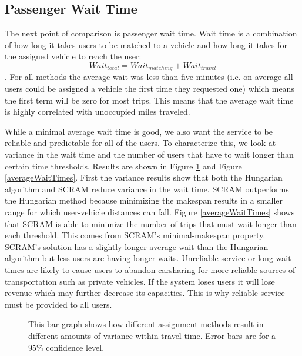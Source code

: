 \documentclass[letterpaper]{article}
\begin{document}
\subsection{Passenger Wait Time}

The next point of comparison is passenger wait time. Wait time is a combination of how long it takes users to be matched to a vehicle and how long it takes for the assigned vehicle to reach the user:
$$Wait_{total} = Wait_{matching} + Wait_{travel} $$
. For all methods the average wait was less than five minutes (i.e. on average all users could be assigned a vehicle the first time they requested one) which means the first term will be zero for most trips. This means that the average wait time is highly correlated with unoccupied miles traveled. 

While a minimal average wait time is good, we also want the service to be reliable and predictable for all of the users. To characterize this, we look at variance in the wait time and the number of users that have to wait longer than certain time thresholds. Results are shown in Figure \ref{averageWaitVarianceGraph} and Figure \ref{averageWaitTimes}. First the variance results show that both the Hungarian algorithm and SCRAM reduce variance in the wait time. SCRAM outperforms the Hungarian method because minimizing the makespan results in a smaller range for which user-vehicle distances can fall. Figure \ref{averageWaitTimes} shows that SCRAM is able to minimize the number of trips that must wait longer than each threshold. This comes from SCRAM's minimal-makespan property. SCRAM's solution has a slightly longer average wait than the Hungarian algorithm but less users are having longer waits. Unreliable service or long wait times are likely to cause users to abandon carsharing for more reliable sources of transportation such as private vehicles. If the system loses users it will lose revenue which may further decrease its capacities. This is why reliable service must be provided to all users.

\begin{figure}
\caption{This bar graph shows how different assignment methods result in different amounts of variance within travel time. Error bars are for a 95$\%$ confidence level.}
\label{averageWaitVarianceGraph}
\end{figure}
\end{document}
